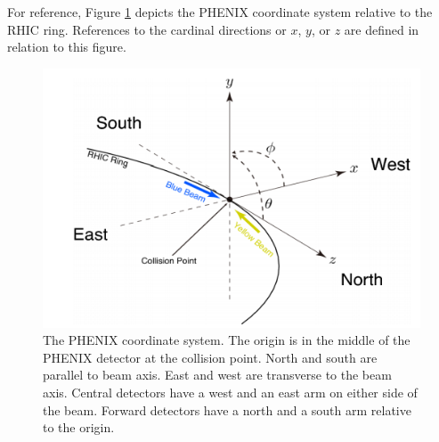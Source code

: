 For reference, Figure \ref{fig:ch3_coord_sys} depicts the PHENIX coordinate system relative to the RHIC ring. References to the cardinal directions or $x$, $y$, or $z$ are defined in relation to this figure.
\begin{figure}[!ht]
\centering
\includegraphics[width=0.55\linewidth]{figs/phenix_coord.png}
\caption{The PHENIX coordinate system. The origin is in the middle of the PHENIX detector at the collision point. North and south are parallel to beam axis. East and west are transverse to the beam axis. Central detectors have a west and an east arm on either side of the beam. Forward detectors have a north and a south arm relative to the origin.}
\label{fig:ch3_coord_sys}
\end{figure}

